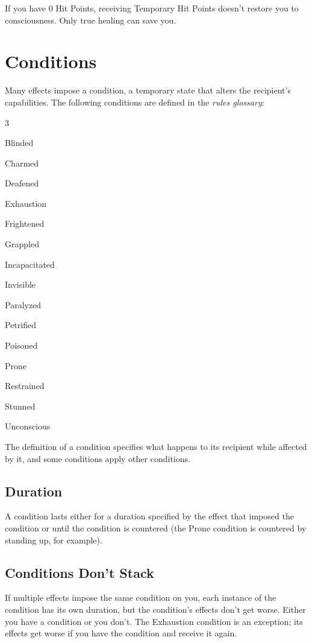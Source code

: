 \documentclass[10pt,a4paper,twoside,bg=print,twocolumn,openany,nodeprecatedcode]{dndbook}
\begin{document}
If you have 0 Hit Points, receiving Temporary Hit Points doesn't restore you to consciousness. Only true healing can save you.

\section{Conditions}
Many effects impose a condition, a temporary state that alters the recipient's capabilities. The following conditions are defined in the \textit{rules glossary}:


\begin{itemize}
\begin{multicols}{3}
\item Blinded
\item Charmed
\item Deafened
\item Exhaustion
\item Frightened
\item Grappled
\item Incapacitated
\item Invisible
\item Paralyzed
\item Petrified
\item Poisoned
\item Prone
\item Restrained
\item Stunned
\item Unconscious
\end{multicols}

\end{itemize}

The definition of a condition specifies what happens to its recipient while affected by it, and some conditions apply other conditions.

\subsection{Duration}
A condition lasts either for a duration specified by the effect that imposed the condition or until the condition is countered (the Prone condition is countered by standing up, for example).

\subsection{Conditions Don't Stack}
If multiple effects impose the same condition on you, each instance of the condition has its own duration, but the condition's effects don't get worse. Either you have a condition or you don't. The Exhaustion condition is an exception; its effects get worse if you have the condition and receive it again.
\end{document}
